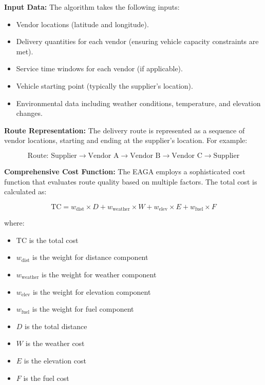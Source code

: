 \textbf{Input Data:}
The algorithm takes the following inputs:
\begin{itemize}
    \item Vendor locations (latitude and longitude).
    \item Delivery quantities for each vendor (ensuring vehicle capacity constraints are met).
    \item Service time windows for each vendor (if applicable).
    \item Vehicle starting point (typically the supplier's location).
    \item Environmental data including weather conditions, temperature, and elevation changes.
\end{itemize}

\textbf{Route Representation:}
The delivery route is represented as a sequence of vendor locations, starting and ending at the supplier's location. For example:

\[
    \text{Route: Supplier} \rightarrow \text{Vendor A} \rightarrow \text{Vendor B} \rightarrow \text{Vendor C} \rightarrow \text{Supplier}
\]

\textbf{Comprehensive Cost Function:}
The EAGA employs a sophisticated cost function that evaluates route quality based on multiple factors. The total cost is calculated as:

\begin{equation}
    \text{TC} = w_{\text{dist}} \times D + w_{\text{weather}} \times W + w_{\text{elev}} \times E + w_{\text{fuel}} \times F
\end{equation}

\noindent where:
\begin{itemize}
    \item $\text{TC}$ is the total cost
    \item $w_{\text{dist}}$ is the weight for distance component
    \item $w_{\text{weather}}$ is the weight for weather component
    \item $w_{\text{elev}}$ is the weight for elevation component
    \item $w_{\text{fuel}}$ is the weight for fuel component
    \item $D$ is the total distance
    \item $W$ is the weather cost
    \item $E$ is the elevation cost
    \item $F$ is the fuel cost
\end{itemize}

